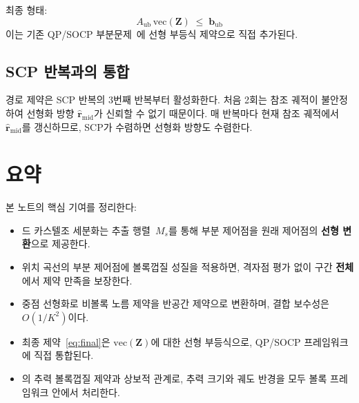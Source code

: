 \documentclass[11pt]{article}
\begin{document}
최종 형태:
\begin{equation}\label{eq:final}
  \boxed{A_{\mathrm{ub}}\,\mathrm{vec}(\mathbf{Z}) \;\le\; \mathbf{b}_{\mathrm{ub}}}
\end{equation}
이는 기존 QP/SOCP 부분문제~\cite{report006}에 선형 부등식 제약으로 직접 추가된다.

\subsection{SCP 반복과의 통합}

경로 제약은 SCP 반복의 3번째 반복부터 활성화한다.
처음 2회는 참조 궤적이 불안정하여 선형화 방향 $\hat{\mathbf{r}}_{\mathrm{mid}}$가
신뢰할 수 없기 때문이다.
매 반복마다 현재 참조 궤적에서 $\hat{\mathbf{r}}_{\mathrm{mid}}$를 갱신하므로,
SCP가 수렴하면 선형화 방향도 수렴한다.

\section{요약}

본 노트의 핵심 기여를 정리한다:
\begin{itemize}
  \item 드 카스텔조 세분화는 추출 행렬~$M_s$를 통해
        부분 제어점을 원래 제어점의 \textbf{선형 변환}으로 제공한다.
  \item 위치 곡선의 부분 제어점에 볼록껍질 성질을 적용하면,
        격자점 평가 없이 구간 \textbf{전체}에서 제약 만족을 보장한다.
  \item 중점 선형화로 비볼록 노름 제약을 반공간 제약으로 변환하며,
        결합 보수성은 $O(1/K^2)$이다.
  \item 최종 제약~\eqref{eq:final}은 $\mathrm{vec}(\mathbf{Z})$에 대한
        선형 부등식으로, QP/SOCP 프레임워크에 직접 통합된다.
  \item \cite{report005}의 추력 볼록껍질 제약과 상보적 관계로,
        추력 크기와 궤도 반경을 모두 볼록 프레임워크 안에서 처리한다.
\end{itemize}



\end{document}
